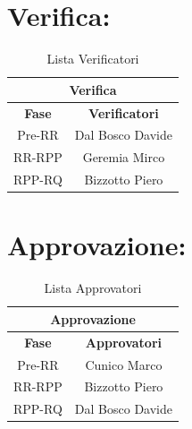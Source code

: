 \section*{\LARGE Verifica:}
\begin{table}[!h]
  \begin{center}
    \begin{tabular}
      {|c|c|}
      \hline
      \multicolumn{2}{|c|}{ \textbf{Verifica} } \\
      \hline
      \textbf{Fase} & \textbf{Verificatori} \\
      \hline
      Pre-RR & Dal Bosco Davide\\
                 
      \hline
      RR-RPP & Geremia Mirco \\
                  
      \hline
      RPP-RQ & Bizzotto Piero \\
                  
      \hline
    \end{tabular}
    \caption{Lista Verificatori} %
    \label{tabverifica}
  \end{center}
\end{table}
 
 
\section*{\LARGE Approvazione:}
\begin{table}[!h]
  \begin{center}
    \begin{tabular}
      {|c|c|}
      \hline
      \multicolumn{2}{|c|}{ \textbf{Approvazione} } \\
      \hline
      \textbf{Fase} & \textbf{Approvatori} \\
      \hline
      Pre-RR & Cunico Marco\\
                 
      \hline
      RR-RPP & Bizzotto Piero \\
                  
      \hline
      RPP-RQ & Dal Bosco Davide \\
                  
      \hline
    \end{tabular}
    \caption{Lista Approvatori} %
    \label{tabapprovazione}
  \end{center}
\end{table} 
 
